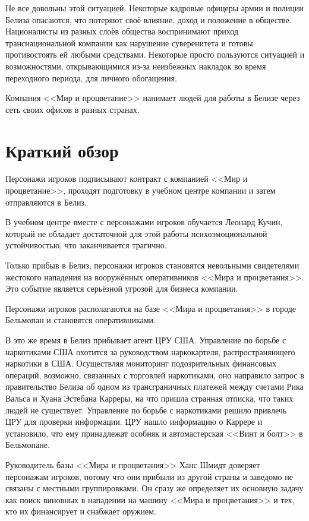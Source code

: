 \documentclass{article}
\begin{document}
Не все довольны этой ситуацией. Некоторые кадровые офицеры армии и
полиции Белиза опасаются, что потеряют своё влияние, доход и положение в
обществе. Националисты из разных слоёв общества воспринимают приход
транснациональной компании как нарушение суверенитета и готовы
противостоять ей любыми средствами. Некоторые просто пользуются
ситуацией и возможностями, открывающимися из-за неизбежных накладок во
время переходного периода, для личного обогащения.

Компания <<Мир и процветание>> нанимает людей для работы в Белизе через
сеть своих офисов в разных странах.

\section{Краткий
обзор}\label{overview}

Персонажи игроков подписывают контракт с компанией <<Мир и процветание>>,
проходят подготовку в учебном центре компании и затем отправляются в
Белиз.

В учебном центре вместе с персонажами игроков обучается Леонард Кучин,
который не обладает достаточной для этой работы психоэмоциональной
устойчивостью, что заканчивается трагично.

Только прибыв в Белиз, персонажи игроков становятся невольными
свидетелями жестокого нападения на вооружённых оперативников <<Мира и
процветания>>. Это событие является серьёзной угрозой для бизнеса
компании.

Персонажи игроков располагаются на базе <<Мира и процветания>> в городе
Бельмопан и становятся оперативниками.

В это же время в Белиз прибывает агент ЦРУ США. Управление по борьбе с
наркотиками США охотится за руководством наркокартеля, распространяющего
наркотики в США. Осуществляя мониторинг подозрительных финансовых
операций, возможно, связанных с торговлей наркотиками, оно направило
запрос в правительство Белиза об одном из трансграничных платежей между
счетами Рика Вальса и Хуана Эстебана Карреры, на что пришла странная
отписка, что таких людей не существует. Управление по борьбе с
наркотиками решило привлечь ЦРУ для проверки информации. ЦРУ нашло
информацию о Каррере и установило, что ему принадлежат особняк и
автомастерская <<Винт и болт>> в Бельмопане.

Руководитель базы <<Мира и процветания>> Ханс Шмидт доверяет персонажам
игроков, потому что они прибыли из другой страны и заведомо не связаны с
местными группировками. Он сразу же определяет их основную задачу как
поиск виновных в нападении на машину <<Мира и процветания>> и тех, кто их
финансирует и снабжает оружием.
\end{document}
